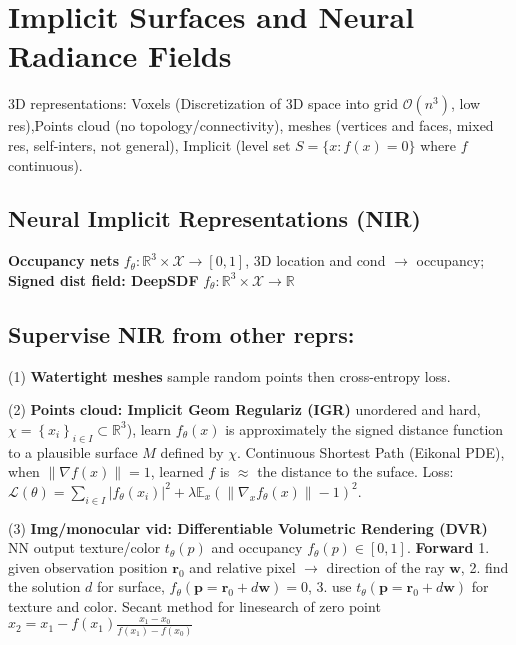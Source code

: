 \section{Implicit Surfaces and Neural Radiance Fields}

3D representations: Voxels (Discretization of 3D space into grid $\mathcal{O}(n^3)$, low res),Points cloud (no topology/connectivity), meshes (vertices and faces, mixed res, self-inters, not general), Implicit (level set \(S = \{x: f(x) = 0\}\) where $f$ continuous).

\subsection*{Neural Implicit Representations (NIR)}

\textbf{Occupancy nets} \(f_{\theta}: \mathbb{R}^{3} \times \mathcal{X} \rightarrow[0,1]\), 3D location and cond $\rightarrow$ occupancy; \textbf{Signed dist field: DeepSDF} \(f_{\theta}: \mathbb{R}^{3} \times \mathcal{X} \rightarrow \mathbb{R}\)

\subsection*{Supervise NIR from other reprs:}

(1) \textbf{Watertight meshes} sample random points then cross-entropy loss.

(2) \textbf{Points cloud: Implicit Geom Regulariz (IGR)} unordered and hard, \(\chi=\left\{x_{i}\right\}_{i \in I} \subset \mathbb{R}^{3}\)), learn \(f_{\theta}(x)\) is approximately the signed distance function to a plausible surface \(M\) defined by \(\chi\).
% 
Continuous Shortest Path (Eikonal PDE), when \(\|\nabla f(x)\|= 1\), learned \(f\) is $\approx$ the distance to the suface.
% 
Loss: \(\mathcal{L}(\theta)=\sum_{i \in I}\left|f_{\theta}\left(x_{i}\right)\right|^{2}+\lambda \mathbb{E}_{x}\left(\left\|\nabla_{x} f_{\theta}(x)\right\|-1\right)^{2}\).

(3) \textbf{Img/monocular vid: Differentiable Volumetric Rendering (DVR)}
% 
NN output texture/color \(t_\theta(p)\) and occupancy \(f_\theta(p) \in [0, 1]\).
% 
\textbf{Forward}
1. given observation position \(\mathbf{r}_0\) and relative pixel \(\to\) direction of the ray \(\mathbf{w}\),
2. find the solution \(d\) for surface, \(f_\theta (\mathbf{p} = \mathbf{r}_0 + d \mathbf{w}) = 0\),
3. use \(t_\theta(\mathbf{p} = \mathbf{r}_0 + d \mathbf{w})\) for texture and color. Secant method for linesearch of zero point \(x_{2}=x_{1}-f\left(x_{1}\right) \frac{x_{1}-x_{0}}{f\left(x_{1}\right)-f\left(x_{0}\right)}\)

